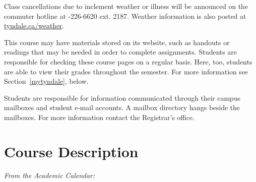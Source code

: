 \begin{titlepage}
\begin{center}
    \begin{description}\footnotesize
      \item[Commuter Hotline]
        Class cancellations due to inclement weather or illness will be
        announced on the commuter hotline at
        {-226-6620 ext. 2187}.
        Weather information is also posted at
        \href{http://tyndale.ca/weather}{tyndale.ca/weather}.
      \item[MyTyndale.ca]
        This course may have materials stored on its website, such as
        handouts or readings that may be needed in order to complete
        assignments. Students are responsible for checking these course
        pages on a regular basis. Here, too, students are able to view
        their grades throughout the semester. For more information see
        Section~\ref{mytyndale}, below.
      \item[Mail]
        Students are responsible for information communicated through
        their campus mailboxes and student e-mail accounts. A mailbox
        directory hangs beside the mailboxes. For more information
        contact the Registrar's office.
    \end{description}

  \end{center}

  \section{Course Description}
  \label{description}

  \emph{From the Academic Calendar:} \cdescrip

\end{titlepage}
\setcounter{page}{2} %
